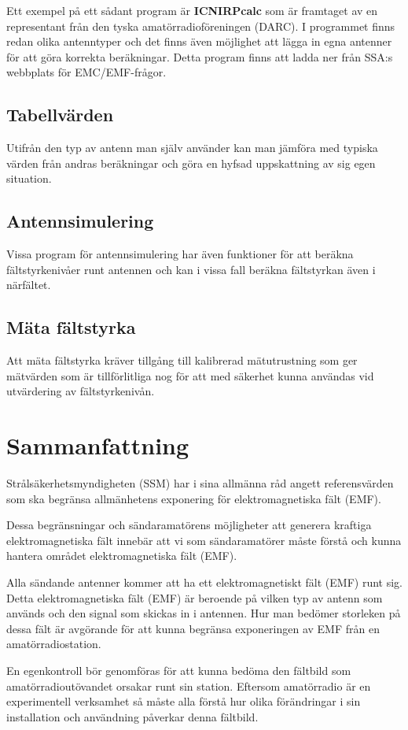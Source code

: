 Ett exempel på ett sådant program är \textbf{ICNIRPcalc} som är framtaget av en
representant från den tyska amatörradioföreningen (DARC).
I programmet finns redan olika antenntyper och det finns även möjlighet att
lägga in egna antenner för att göra korrekta beräkningar.
Detta program finns att ladda ner från SSA:s webbplats för EMC/EMF-frågor.

\subsection{Tabellvärden}
Utifrån den typ av antenn man själv använder kan man jämföra med
typiska värden från andras beräkningar och göra en hyfsad uppskattning
av sig egen situation.

\subsection{Antennsimulering}
Vissa program för antennsimulering har även funktioner för att beräkna
fältstyrkenivåer runt antennen och kan i vissa fall beräkna fältstyrkan
även i närfältet.

\subsection{Mäta fältstyrka}
Att mäta fältstyrka kräver tillgång till kalibrerad mätutrustning som
ger mätvärden som är tillförlitliga nog för att med säkerhet kunna användas
vid utvärdering av fältstyrkenivån.

\section{Sammanfattning}
Strålsäkerhetsmyndigheten (SSM) har i sina allmänna råd angett referensvärden
som ska begränsa allmänhetens exponering för elektromagnetiska fält (EMF).

Dessa begränsningar och sändaramatörens möjligheter att generera kraftiga
elektromagnetiska fält innebär att vi som sändaramatörer måste förstå
och kunna hantera området elektromagnetiska fält (EMF).

Alla sändande antenner kommer att ha ett elektromagnetiskt fält (EMF)
runt sig.
Detta elektromagnetiska fält (EMF) är beroende på vilken typ av antenn som
används och den signal som skickas in i antennen.
Hur man bedömer storleken på dessa fält är avgörande för att kunna
begränsa exponeringen av EMF från en amatörradiostation.

En egenkontroll bör genomföras för att kunna bedöma den fältbild som
amatörradioutövandet orsakar runt sin station.
Eftersom amatörradio är en experimentell verksamhet så måste alla förstå hur
olika förändringar i sin installation och användning påverkar denna fältbild.


